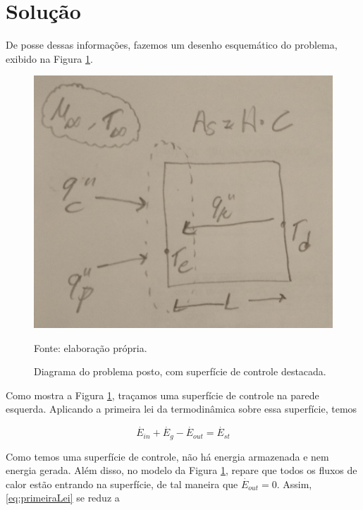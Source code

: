 \documentclass[12pt]{scrartcl}
\begin{document}
\section{Solução}

De posse dessas informações, fazemos um desenho esquemático do problema, exibido na
Figura \ref{fig:problemaParede}.

\begin{figure}[h!]
    \caption{Diagrama do problema posto, com superfície de controle destacada.}
    \label{fig:problemaParede}
    \centering
    \includegraphics[scale=0.18]{esquematico.jpeg}
    \par{Fonte: elaboração própria.}
\end{figure}

Como mostra a Figura \ref{fig:problemaParede}, traçamos uma superfície de controle na
parede esquerda. Aplicando a primeira lei da termodinâmica sobre essa superfície, temos

\begin{equation}\label{eq:primeiraLei}
    \overset{\cdot}{E}_{in} + \overset{\cdot}{E}_{g} - \overset{\cdot}{E}_{out} = \overset{\cdot}{E}_{st}
\end{equation}

Como temos uma superfície de controle, não há energia armazenada e nem energia gerada. Além disso, no modelo
da Figura \ref*{fig:problemaParede}, repare que todos os fluxos de calor estão entrando na superfície, de tal
maneira que $\overset{\cdot}{E}_{out} = 0$. Assim, \eqref{eq:primeiraLei} se reduz a
\end{document}
